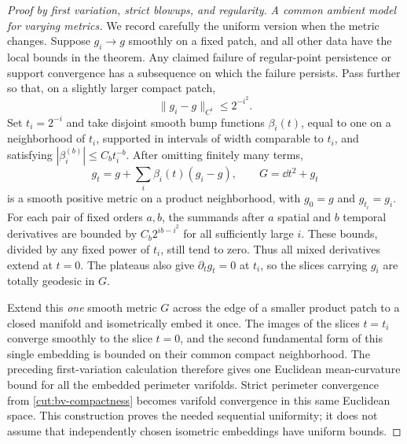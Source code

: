 \begin{proof}[Proof by first variation, strict blowups, and regularity]
\emph{A common ambient model for varying metrics.}
We record carefully the uniform version when the metric changes.
Suppose $g_i\to g$ smoothly on a fixed patch, and all other data have
the local bounds in the theorem.  Any claimed failure of regular-point
persistence or support convergence has a subsequence on which the
failure persists.  Pass further so that, on a slightly larger compact
patch,
\[
                  \|g_i-g\|_{C^i}\le 2^{-i^2}.
\]
Set $t_i=2^{-i}$ and take disjoint smooth bump functions $\beta_i(t)$,
equal to one on a neighborhood of $t_i$, supported in intervals of
width comparable to $t_i$, and satisfying
$|\beta_i^{(b)}|\le C_b t_i^{-b}$.  After omitting finitely many terms,
\[
 g_t=g+\sum_i\beta_i(t)(g_i-g),\qquad G=\dd t^2+g_t
\]
is a smooth positive metric on a product neighborhood, with $g_0=g$
and $g_{t_i}=g_i$.  For each pair of fixed orders $a,b$, the summands
after $a$ spatial and $b$ temporal derivatives are bounded by
$C_b2^{ib-i^2}$ for all sufficiently large $i$.  These bounds, divided
by any fixed power of $t_i$, still tend to zero.  Thus all mixed
derivatives extend at $t=0$.  The plateaus also give
$\partial_tg_t=0$ at $t_i$, so the slices carrying $g_i$ are totally
geodesic in $G$.

Extend this \emph{one} smooth metric $G$ across the edge of a smaller
product patch to a closed manifold and isometrically embed it once.
The images of the slices $t=t_i$ converge smoothly to the slice
$t=0$, and the second fundamental form of this single embedding is
bounded on their common compact neighborhood.  The preceding
first-variation calculation therefore gives one Euclidean
mean-curvature bound for all the embedded perimeter varifolds.
Strict perimeter convergence from \cref{cut:bv-compactness} becomes
varifold convergence in this same Euclidean space.  This construction
proves the needed sequential uniformity; it does not assume that
independently chosen isometric embeddings have uniform bounds.


\end{proof}
